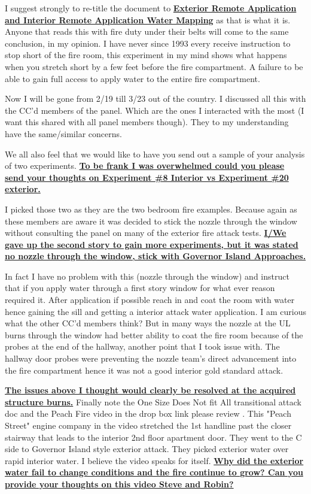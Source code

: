 \documentclass[12pt,oneside]{book}
\begin{document}
\begin{appendix}
I suggest strongly to re-title the document to \textbf{\ul{Exterior Remote Application and Interior Remote Application Water Mapping}} as that is what it is.  Anyone that reads this with fire duty under their belts will come to the same conclusion, in my opinion.  I have never since 1993 every receive instruction to stop short of the fire room, this experiment in my mind shows what happens when you stretch short by a few feet before the fire compartment.  A failure to be able to gain full access to apply water to the entire fire compartment.    

Now I will be gone from 2/19 till 3/23 out of the country.  I discussed all this with the CC'd members of the panel.  Which are the ones I interacted with the most  (I want this shared with all panel members though).  They to my understanding have the same/similar concerns.  

We all also feel that we would like to have you send out a sample of your analysis of two experiments.  \textbf{\ul{To be frank I was overwhelmed could you please send your thoughts on Experiment \#8 Interior vs  Experiment \#20 exterior.}}  

I picked those two as they are the two bedroom fire examples.  Because again as these members are aware it was decided to stick the nozzle through the window without consulting the panel on many of the exterior fire attack tests.  \textbf{\ul{I/We gave up the second story to gain more experiments, but it was stated no nozzle through the window, stick with Governor Island Approaches.}}  

In fact I have no problem with this (nozzle through the window) and instruct that if you apply water through a first story window for what ever reason required it.  After application if possible reach in and coat the room with water hence gaining the sill and getting a interior attack water application.  I am curious what the other CC'd members think?  But in many ways the nozzle at the UL burns through the window had better ability to coat the fire room because of the probes at the end of the hallway, another point that I took issue with.  The hallway door probes were preventing the nozzle team's direct advancement into the fire compartment hence it was not a good interior gold standard attack.   

\textbf{\ul{The issues above I thought would clearly be resolved at the acquired structure burns.}}  Finally note the One Size Does Not fit All transitional attack doc and the Peach Fire video in the drop box link please review .  This "Peach Street" engine company in the video stretched the 1st handline past the closer stairway that leads to the interior 2nd floor apartment door.  They went to the C side to Governor Island style exterior attack.  They picked exterior water over rapid interior water.  I believe the video speaks for itself.  \textbf{\ul{Why did the exterior water fail to change conditions and the fire continue to grow?  Can you provide your thoughts on this video Steve and Robin?}}  


\end{appendix}
\end{document}

